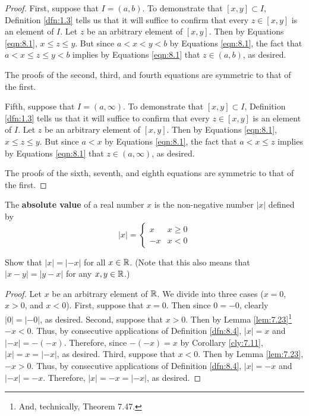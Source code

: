 \documentclass[../main.tex]{subfiles}
\begin{document}
\begin{lemma}
\begin{proof}
        First, suppose that $I=(a,b)$. To demonstrate that $[x,y]\subset I$, Definition \ref{dfn:1.3} tells us that it will suffice to confirm that every $z\in[x,y]$ is an element of $I$. Let $z$ be an arbitrary element of $[x,y]$. Then by Equations \ref{eqn:8.1}, $x\leq z\leq y$. But since $a<x<y<b$ by Equations \ref{eqn:8.1}, the fact that $a<x\leq z\leq y<b$ implies by Equations \ref{eqn:8.1} that $z\in(a,b)$, as desired.\par
        The proofs of the second, third, and fourth equations are symmetric to that of the first.\par
        Fifth, suppose that $I=(a,\infty)$. To demonstrate that $[x,y]\subset I$, Definition \ref{dfn:1.3} tells us that it will suffice to confirm that every $z\in[x,y]$ is an element of $I$. Let $z$ be an arbitrary element of $[x,y]$. Then by Equations \ref{eqn:8.1}, $x\leq z\leq y$. But since $a<x$ by Equations \ref{eqn:8.1}, the fact that $a<x\leq z$ implies by Equations \ref{eqn:8.1} that $z\in(a,\infty)$, as desired.\par
        The proofs of the sixth, seventh, and eighth equations are symmetric to that of the first.
    \end{proof}
\end{lemma}

\begin{definition}\label{dfn:8.4}
    The \textbf{absolute value} of a real number $x$ is the non-negative number $|x|$ defined by
    \begin{equation*}
        |x| =
        \begin{cases}
            x & x\geq 0\\
            -x & x<0
        \end{cases}
    \end{equation*}
\end{definition}

\begin{exercise}\label{exr:8.5}
    Show that $|x|=|-x|$ for all $x\in\mathbb{R}$. (Note that this also means that $|x-y|=|y-x|$ for any $x,y\in\mathbb{R}$.)
    \begin{proof}
        Let $x$ be an arbitrary element of $\mathbb{R}$. We divide into three cases ($x=0$, $x>0$, and $x<0$). First, suppose that $x=0$. Then since $0=-0$, clearly $|0|=|-0|$, as desired. Second, suppose that $x>0$. Then by Lemma \ref{lem:7.23}\footnote{And, technically, Theorem 7.47.} $-x<0$. Thus, by consecutive applications of Definition \ref{dfn:8.4}, $|x|=x$ and $|-x|=-(-x)$. Therefore, since $-(-x)=x$ by Corollary \ref{cly:7.11}, $|x|=x=|-x|$, as desired. Third, suppose that $x<0$. Then by Lemma \ref{lem:7.23}, $-x>0$. Thus, by consecutive applications of Definition \ref{dfn:8.4}, $|x|=-x$ and $|-x|=-x$. Therefore, $|x|=-x=|-x|$, as desired.
    \end{proof}
\end{exercise}
\end{document}
